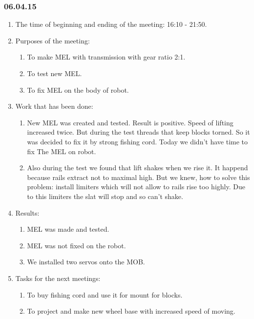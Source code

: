 \subsubsection{06.04.15}
\begin{enumerate}
	
	\item The time of beginning and ending of the meeting: 16:10 - 21:50.
	
	\item Purposes of the meeting: 
	\begin{enumerate}
		
		\item To make MEL with transmission with gear ratio 2:1.
		
		\item To test new MEL.
		
        \item To fix MEL on the body of robot.
		
	\end{enumerate}

	\item Work that has been done:
	\begin{enumerate}
		
		\item New MEL was created and tested. Result is positive. Speed of lifting increased twice. But during the test threads that keep blocks torned. So it was decided to fix it by strong fishing cord. Today we didn't have time to fix The MEL on robot.
		
		\item Also during the test we found that lift shakes when we rise it. It happend because rails extract not to maximal high. But we knew, how to solve this problem: install limiters which will not allow to rails rise too highly. Due to this limiters the slat will stop and so can't shake.
		
	\end{enumerate}
	
	\item Results:
	\begin{enumerate}
		
		\item MEL was made and tested.
		
		\item MEL was not fixed on the robot.
		
		\item We installed two servos onto the MOB.

	\end{enumerate}
	
	\item Tasks for the next meetings:
	\begin{enumerate}
		
		\item To buy fishing cord and use it for mount for blocks.
		
		\item To project and make new wheel base with increased speed of moving.

	\end{enumerate}
\end{enumerate}
\fillpage
